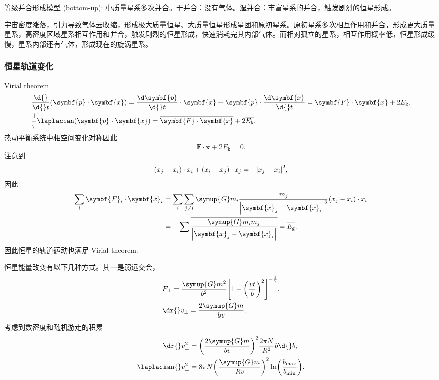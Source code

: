 \documentclass[../天体物理基础.tex]{subfiles}
\begin{document}
等级并合形成模型 (bottom-up): 小质量星系多次并合。干并合：没有气体。湿并合：丰富星系的并合，触发剧烈的恒星形成。

宇宙密度涨落，引力导致气体云收缩，形成极大质量恒星、大质量恒星形成星团和原初星系。原初星系多次相互作用和并合，形成更大质量星系，高密度区域星系相互作用和并合，触发剧烈的恒星形成，快速消耗完其内部气体。而相对孤立的星系，相互作用概率低，恒星形成缓慢，星系内部还有气体，形成现在的旋涡星系。

\subsubsection{恒星轨道变化}
Virial theorem
\begin{align}
&\frac{\d{}}{\d{}t}\mleft(\symbf{p}\cdot\symbf{x}\mright)=\frac{\d\symbf{p}}{\d{}t}\cdot\symbf{x}+\symbf{p}\cdot\frac{\d\symbf{x}}{\d{}t}=\symbf{F}\cdot\symbf{x}+2E_{\mathrm{k}}.\\
&\frac{1}{\tau}\laplacian\mleft(\symbf{p}\cdot\symbf{x}\mright)=\overline{\symbf{F}\cdot\symbf{x}}+2\overline{E_{\mathrm{k}}}.
\end{align}
热动平衡系统中相空间变化对称因此
\begin{equation}
\overline{\symbf{F}\cdot\symbf{x}}+2\overline{E_{\mathrm{k}}}=0.
\end{equation}
注意到
\begin{equation}
\mleft(x_{j}-x_{i}\mright)\cdot x_{i}+\mleft(x_{i}-x_{j}\mright)\cdot x_{j}=-\mleft\vert{}x_{j}-x_{i}\mright\vert^{2},
\end{equation}
因此
\begin{align}
\sum_{i}\symbf{F}_{i}\cdot\symbf{x}_{i}&=\sum_{i}\sum_{j\ne{}i}\symup{G}m_{i}\frac{m_{j}}{\mleft\vert\symbf{x}_{j}-\symbf{x}_{i}\mright\vert^{3}}\mleft(x_{j}-x_{i}\mright)\cdot x_{i}\notag\\
&=-\sum\overline{\frac{\symup{G}m_{i}m_{j}}{\mleft\vert\symbf{x}_{j}-\symbf{x}_{i}\mright\vert{}}}=\overline{E_{\mathrm{g}}}.
\end{align}
因此恒星的轨道运动也满足 Virial theorem.

恒星能量改变有以下几种方式。其一是弱远交会，
\begin{align}
&F_{\bot}=\frac{\symup{G}m^{2}}{b^{2}}\mleft[1+\mleft(\frac{vt}{b}\mright)^{2}\mright]^{-\frac{3}{2}}.\\
&\dr{}v_{\bot}=\frac{2\symup{G}m}{bv}.
\end{align}
考虑到数密度和随机游走的积累
\begin{align}
\dr{}v_{\bot}^{2}&=\mleft(\frac{2\symup{G}m}{bv}\mright)^{2}\frac{2\pi N}{R^{2}}b\d{}b,\\
\laplacian{}v_{\bot}^{2}&=8\pi N\mleft(\frac{\symup{G}m}{Rv}\mright)^{2}\ln
\mleft(\frac{b_{\max}}{b_{\min}}\mright).
\end{align}
\end{document}
